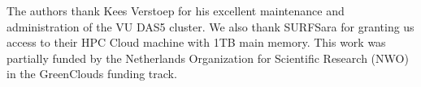 The authors thank Kees Verstoep for his excellent maintenance
and administration of the VU DAS5 cluster. We also thank SURFSara for
granting us access to their HPC Cloud machine with 1TB main memory.
This work was partially funded by the Netherlands Organization for Scientific
Research (NWO) in the GreenClouds funding track.

